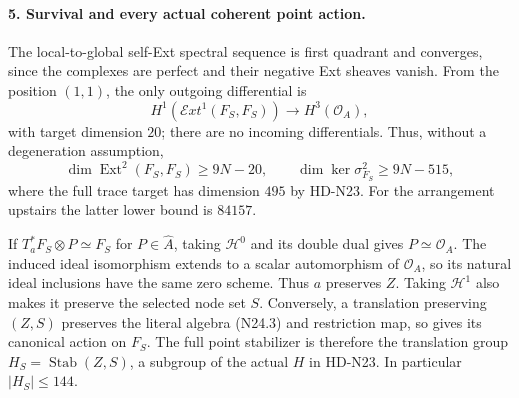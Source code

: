 \paragraph{5. Survival and every actual coherent point action.}
The local-to-global self-Ext spectral sequence is first quadrant
and converges, since the complexes are perfect and their
negative Ext sheaves vanish. From the position $(1,1)$, the
only outgoing differential is
\[
 H^1(\mathcal E xt^1(F_S,F_S))\longrightarrow
                         H^3(\mathcal O_A),                \tag{N24.21}
\]
with target dimension $20$; there are no incoming differentials.
Thus, without a degeneration assumption,
\[
 \dim\operatorname{Ext}^2(F_S,F_S)\ge9N-20,
 \qquad\dim\ker\sigma^2_{F_S}\ge9N-515,                    \tag{N24.22}
\]
where the full trace target has dimension $495$ by HD-N23.
For the arrangement upstairs the latter lower bound is $84157$.

If $T_a^*F_S\otimes P\simeq F_S$ for $P\in\widehat A$,
taking $\mathcal H^0$ and its double dual gives
$P\simeq\mathcal O_A$. The induced ideal isomorphism extends
to a scalar automorphism of $\mathcal O_A$, so its natural
ideal inclusions have the same zero scheme. Thus $a$ preserves
$Z$. Taking $\mathcal H^1$ also makes it preserve the selected
node set $S$. Conversely, a translation preserving $(Z,S)$
preserves the literal algebra (N24.3) and restriction map,
so gives its canonical action on $F_S$.
The full point stabilizer is therefore the translation group
$H_S=\operatorname{Stab}(Z,S)$, a subgroup of the actual
$H$ in HD-N23. In particular $|H_S|\le144$.

